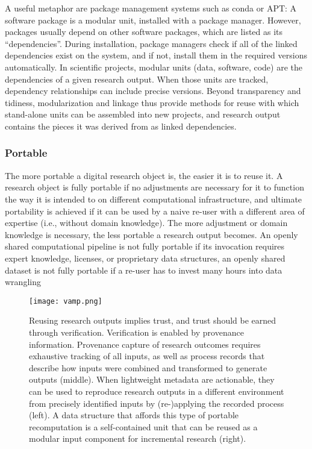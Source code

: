 A useful metaphor are package management systems such as conda or APT: A software package is a modular unit, installed with a package manager. However, packages usually depend on other software packages, which are listed as its “dependencies”. During installation, package managers check if all of the linked dependencies exist on the system, and if not, install them in the required versions automatically. In scientific projects, modular units (data, software, code) are the dependencies of a given research output. When those units are tracked, dependency relationships can include precise versions. Beyond transparency and tidiness, modularization and linkage thus provide methods for reuse with which stand-alone units can be assembled into new projects, and research output contains the pieces it was derived from as linked dependencies.


\subsubsection{Portable}

The more portable a digital research object is, the easier it is to reuse it.
A research object is fully portable if no adjustments are necessary for it to function the way it is intended to on different computational infrastructure, and ultimate portability is achieved if it can be used by a naive re-user with a different area of expertise (i.e., without domain knowledge).
The more adjustment or domain knowledge is necessary, the less portable a research output becomes. An openly shared computational pipeline is not fully portable if its invocation requires expert knowledge, licenses, or proprietary data structures, an openly shared dataset is not fully portable if a re-user has to invest many hours into data wrangling


\begin{figure}
	\centering
	\texttt{[image: vamp.png]}
	\caption[DataLad datasets as reusable research objects]{Reusing research outputs implies trust, and trust should be earned through verification. Verification is enabled by provenance information. Provenance capture of research outcomes requires exhaustive tracking of all inputs, as well as process records that describe how inputs were combined and transformed to generate outputs (middle). When lightweight metadata are actionable, they can be used to reproduce research outputs in a different environment from precisely identified inputs by (re-)applying the recorded process (left). A data structure that affords this type of portable recomputation is a self-contained unit that can be reused as a modular input component for incremental research (right).
	}
	\label{fig:vamp}
\end{figure}





